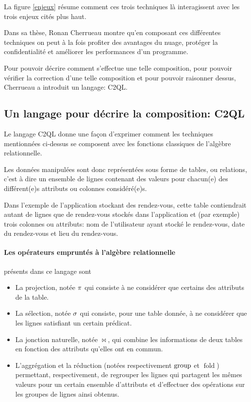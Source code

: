 La figure \ref{enjeux} résume comment ces trois techniques
là interagissent avec les trois enjeux cités plus haut.

Dans sa thèse, Ronan Cherrueau montre qu'en composant ces différentes techniques
on peut à la fois profiter des avantages du nuage, protéger la confidentialité
et améliorer les performances d'un programme.

Pour pouvoir décrire comment s'effectue une telle composition,
pour pouvoir vérifier la correction d'une telle composition et
pour pouvoir raisonner dessus, Cherrueau a introduit un langage: C2QL.

\subsection{Un langage pour décrire la composition: C2QL}
Le langage C2QL donne une façon d'exprimer comment les techniques
mentionnées ci-dessus se composent avec les fonctions classiques de l'algèbre relationnelle.

Les données manipulées sont donc représentées sous forme de tables, ou relations,
c'est à dire un ensemble de lignes contenant des valeurs pour chacun(e) des 
différent(e)s attributs ou colonnes considéré(e)s.

Dans l'exemple de l'application stockant des rendez-vous, cette
table contiendrait autant de lignes que de rendez-vous stockés 
dans l'application et (par exemple) trois colonnes ou attributs: 
nom de l'utilisateur
ayant stocké le rendez-vous, date du rendez-vous et lieu du rendez-vous.

\paragraph{Les opérateurs empruntés à l'algèbre relationnelle}
présents dans ce langage sont
\begin{itemize}
	\item La projection, notée $\proj$ 
	qui consiste à ne considérer que certains des attributs de la table.
	\item La sélection, notée $\sel$
	qui consiste, pour une table donnée, à ne considérer que
	les lignes satisfiant un certain prédicat.
	\item La jonction naturelle, notée $\Join$, qui combine
	les informations de deux tables en fonction des attributs qu'elles ont
	en commun.
	\item L'aggrégation et la réduction
	(notées respectivement $\operatorname{group}$ et $\operatorname{fold}$)
	permettant, respectivement, 
	de regrouper les lignes qui partagent les mêmes valeurs
	pour un certain ensemble d'attributs
	et d'effectuer des opérations sur les groupes de lignes ainsi obtenus.
\end{itemize}

